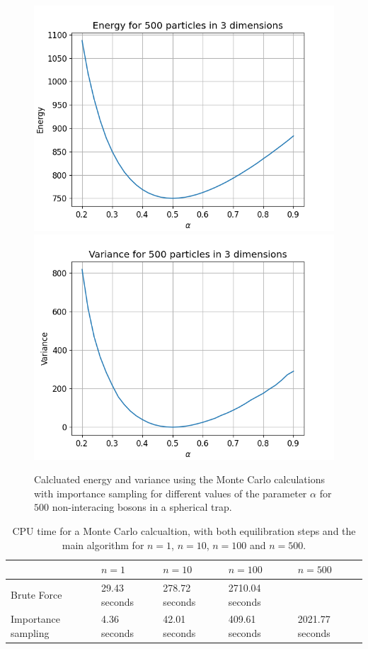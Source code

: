 \documentclass[a4paper, 10pt, english]{revtex4-2} %
\begin{document}
    \begin{figure}[!ht]
        \centering
        \includegraphics[width=\imwidth]{figures/Energy_C_500.png}
        \includegraphics[width=\imwidth]{figures/Varience_C_500.png}
        \caption{Calcluated energy and variance using the Monte Carlo calculations with importance sampling for different values of the parameter $\alpha$ for $500$ non-interacing bosons in a spherical trap.}
        \label{fig: C500}
    \end{figure}\newpage
    
    \begin{table}[!ht]
        \begin{tabular}{|l|l|l|l|l|}
        \hline
                            & $n=1$         & $n=10$         & $n=100$         & $n=500$         \\ \hline
        Brute Force         & 29.43 seconds & 278.72 seconds & 2710.04 seconds &            \\ \hline
        Importance sampling & 4.36 seconds  & 42.01 seconds  & 409.61 seconds  & 2021.77 seconds \\ \hline
        \end{tabular}
        \caption{CPU time for a Monte Carlo calcualtion, with both equilibration steps and the main algorithm for $n=1$, $n=10$, $n=100$ and $n = 500$.}
        \label{table: time spent}
    \end{table}
\end{document}
